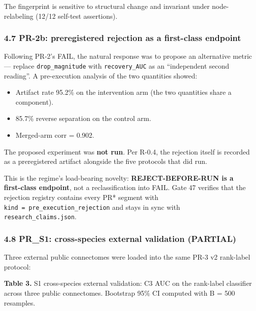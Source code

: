 \documentclass[
]{article}
\providecommand{\tightlist}{%
  \setlength{\itemsep}{0pt}\setlength{\parskip}{0pt}}
\begin{document}
The fingerprint is sensitive to structural change and invariant under
node-relabeling (12/12 self-test assertions).

\subsubsection{4.7 PR-2b: preregistered rejection as a first-class
endpoint}\label{pr-2b-preregistered-rejection-as-a-first-class-endpoint}

Following PR-2's FAIL, the natural response was to propose an
alternative metric --- replace \texttt{drop\_magnitude} with
\texttt{recovery\_AUC} as an ``independent second reading''. A
pre-execution analysis of the two quantities showed:

\begin{itemize}
\tightlist
\item
  Artifact rate 95.2\% on the intervention arm (the two quantities share
  a component).
\item
  85.7\% reverse separation on the control arm.
\item
  Merged-arm \textbar corr\textbar{} = 0.902.
\end{itemize}

The proposed experiment was \textbf{not run}. Per R-0.4, the rejection
itself is recorded as a preregistered artifact alongside the five
protocols that did run.

This is the regime's load-bearing novelty: \textbf{REJECT-BEFORE-RUN is
a first-class endpoint}, not a reclassification into FAIL. Gate 47
verifies that the rejection registry contains every PR* segment with
\texttt{kind\ =\ pre\_execution\_rejection} and stays in sync with
\texttt{research\_claims.json}.

\subsubsection{4.8 PR\_S1: cross-species external validation
(PARTIAL)}\label{pr_s1-cross-species-external-validation-partial}

Three external public connectomes were loaded into the same PR-3 v2
rank-label protocol:

\textbf{Table 3.} S1 cross-species external validation: C3 AUC on the
rank-label classifier across three public connectomes. Bootstrap 95\% CI
computed with B = 500 resamples.
\end{document}
